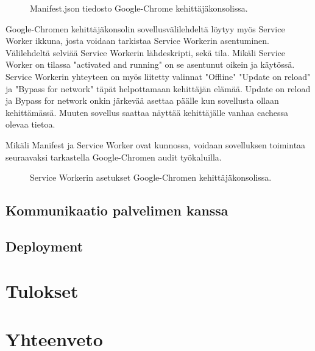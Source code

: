 \documentclass{tktltiki}
\begin{document}
\begin{figure}[h]
\begin{center}
\caption{Manifest.json tiedosto Google-Chrome kehittäjäkonsolissa.}
\label{Manifest.json}
\end{center}
\end{figure}
\clearpage

Google-Chromen kehittäjäkonsolin sovellusvälilehdeltä löytyy myös Service Worker ikkuna, josta voidaan tarkistaa Service Workerin asentuminen. Välilehdeltä selviää Service Workerin lähdeskripti, sekä tila. Mikäli Service Worker on tilassa "activated and running" on se asentunut oikein ja käytössä. Service Workerin yhteyteen on myös liitetty valinnat "Offline" "Update on reload" ja "Bypass for network" täpät helpottamaan kehittäjän elämää. Update on reload ja Bypass for network onkin järkevää asettaa päälle kun sovellusta ollaan kehittämässä. Muuten sovellus saattaa näyttää kehittäjälle vanhaa cachessa olevaa tietoa. 

Mikäli Manifest ja Service Worker ovat kunnossa, voidaan sovelluksen toimintaa seuraavaksi tarkastella Google-Chromen audit työkaluilla.

\begin{figure}[h]
\begin{center}
\caption{Service Workerin asetukset Google-Chromen kehittäjäkonsolissa.}
\label{Service Worker}
\end{center}
\end{figure}

\subsection{Kommunikaatio palvelimen kanssa}

\subsection{Deployment}


\clearpage
\section{Tulokset}

\clearpage
\section{Yhteenveto}


\nocite{*}
%
%


%

\clearpage


\lastpage

\appendices
\end{document}
